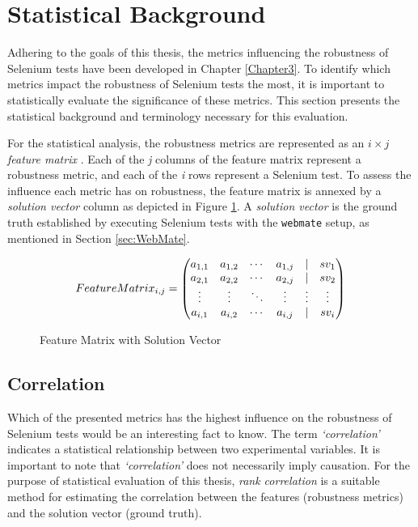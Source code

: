 
\section{Statistical Background}
\label{sec:Statistical}
Adhering to the goals of this thesis, the metrics influencing the robustness of Selenium tests have been developed in Chapter \ref{Chapter3}. To identify which metrics impact the robustness of Selenium tests the most, it is important to statistically evaluate the significance of these metrics. This section presents the statistical background and terminology necessary for this evaluation.

For the statistical analysis, the robustness metrics are represented as an $i\times j$  \textit{feature matrix} \cite{li2005lasso}. Each of the \textit{j} columns of the feature matrix represent a robustness metric, and each of the
\textit{i} rows represent a Selenium test. To assess the influence each metric has on robustness, the feature matrix is annexed by a \textit{solution vector} column as depicted in Figure \ref{fig:featurematrix}. A \textit{solution vector} is the ground truth established by executing Selenium tests with the \texttt{webmate} setup, as mentioned in Section \ref{sec:WebMate}.

\begin{figure}[ht]
\[
Feature\smallskip Matrix_{i,j} = 
\begin{pmatrix}
  a_{1,1} & a_{1,2} & \cdots & a_{1,j} & | & \textit{$sv_{1}$}\\
  a_{2,1} & a_{2,2} & \cdots & a_{2,j} & | & \textit{$sv_{2}$}\\
  \vdots  & \vdots  & \ddots & \vdots  & \vdots & \vdots \\
  a_{i,1} & a_{i,2} & \cdots & a_{i,j} & | & \textit{$sv_{i}$}
\end{pmatrix}
\]
\caption{Feature Matrix with Solution Vector}
\label{fig:featurematrix}
\end{figure}

\subsection{Correlation}
Which of the presented metrics has the highest influence on the robustness of Selenium tests would be an interesting fact to know. The term \textit{`correlation'} indicates a statistical relationship between two experimental variables. It is important to note that \textit{`correlation'} does not necessarily imply causation. For the  purpose of statistical evaluation of this thesis, \textit{rank correlation} is a suitable method for estimating the correlation between the features (robustness metrics) and the solution vector (ground truth).

